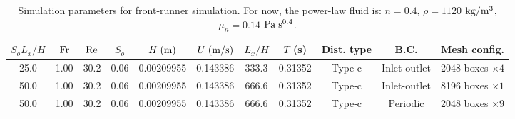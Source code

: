 \documentclass[a4paper]{article}
\newcommand{\fr}{{\rm{Fr}}}
\begin{document}
\begin{table}[htbp]
	\centering
	\begin{tabular}{ccccccccccc}
		$S_oL_x/H$ & $\fr$ & $\rm Re$ & $S_o$ & $H\;{\rm (m)}$ & $U\;{\rm (m/s)}$ & $L_x/H$ & $T$ (s) & Dist. type & B.C.  & Mesh config.\\
		\toprule
		25.0 & 1.00 & 30.2 & 0.06 & 0.00209955 & 0.143386 & 333.3 & 0.31352 & Type-c & Inlet-outlet & 2048 boxes $\times 4$\\
		50.0 & 1.00 & 30.2 & 0.06 & 0.00209955 & 0.143386 & 666.6 & 0.31352 & Type-c & Inlet-outlet & 8196 boxes $\times 1$\\
		50.0 & 1.00 & 30.2 & 0.06 & 0.00209955 & 0.143386 & 666.6 & 0.31352 & Type-c & Periodic & 2048 boxes $\times 9$\\
		\bottomrule 
	\end{tabular}
	\caption{Simulation parameters for front-runner simulation. For now, the power-law fluid is: $n=0.4$, $\rho=1120$ $\rm{kg/m^3}$, $\mu_n=0.14$ $\rm Pa\;s^{0.4}$.}
	\label{simulation4}
\end{table}
\end{document}
